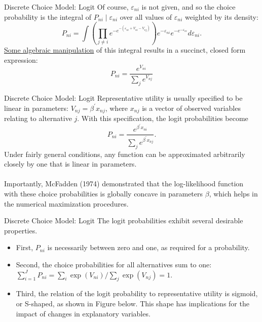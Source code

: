 \begin{frame}{Discrete Choice Model: Logit}
\label{logit}
Of course, $\varepsilon_{n i}$ is not given, and so the choice probability is the integral of $P_{n i} \mid \varepsilon_{n i}$ over all values of $\varepsilon_{n i}$ weighted by its density:
$$
P_{n i}=\int\left(\prod_{j \neq i} e^{-e^{-\left(\varepsilon_{n i}+V_{n i}-V_{n j}\right)}}\right) e^{-\varepsilon_{n i}} e^{-e^{-\varepsilon_{n i}}} d \varepsilon_{n i} .
$$
\hyperlink{DofL}{Some algebraic manipulation}
 of this integral results in a succinct, closed form expression:
$$
P_{n i}=\frac{e^{V_{n i}}}{\sum_j e^{V_{n j}}}
$$

\end{frame}


\begin{frame}{Discrete Choice Model: Logit}
Representative utility is usually specified to be linear in parameters: $V_{n j}=\beta^{\prime} x_{n j}$, where $x_{n j}$ is a vector of observed variables relating to alternative $j$. With this specification, the logit probabilities become
$$
P_{n i}=\frac{e^{\beta^{\prime} x_{n i}}}{\sum_j e^{\beta^{\prime} x_{n j}}} .
$$
Under fairly general conditions, any function can be approximated arbitrarily closely by one that is linear in parameters.
\\ \hspace*{\fill} \\
Importantly, McFadden (1974) demonstrated that the log-likelihood function with these choice probabilities is globally concave in parameters $\beta$, which helps in the numerical maximization procedures.
\end{frame}




\begin{frame}{Discrete Choice Model: Logit}
The logit probabilities exhibit several desirable properties.
\begin{itemize}
\item First, $P_{n i}$ is necessarily between zero and one, as required for a probability.
\item Second, the choice probabilities for all alternatives sum to one: $\sum_{i=1}^J P_{n i}=\sum_i \exp \left(V_{n i}\right) / \sum_j \exp \left(V_{n j}\right)=1$.
\item Third, the relation of the logit probability to representative utility is sigmoid, or S-shaped, as shown in Figure below. This shape has implications for the impact of changes in explanatory variables.
\end{itemize}
\end{frame}


